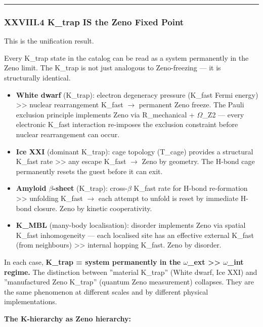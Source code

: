 \documentclass[12pt,a4paper]{article}
\begin{document}
\begin{center}
\rule{0.5\textwidth}{0.4pt}
\end{center}

\subsubsection{XXVIII.4 K\_trap IS the Zeno Fixed Point}

This is the unification result.

Every K\_trap state in the catalog can be read as a system permanently in the Zeno limit. The K\_trap is not just analogous to Zeno-freezing --- it is structurally identical.

\begin{itemize}
    \item \textbf{White dwarf} (K\_trap): electron degeneracy pressure (K\_fast Fermi energy) \textgreater{}\textgreater{} nuclear rearrangement K\_fast $\rightarrow$ permanent Zeno freeze. The Pauli exclusion principle implements Zeno via R\_mechanical + $\Omega$\_Z2 --- every electronic K\_fast interaction re-imposes the exclusion constraint before nuclear rearrangement can occur.
    \item \textbf{Ice XXI} (dominant K\_trap): cage topology (T\_cage) provides a structural K\_fast rate \textgreater{}\textgreater{} any escape K\_fast $\rightarrow$ Zeno by geometry. The H-bond cage permanently resets the guest before it can exit.
    \item \textbf{Amyloid $\beta$-sheet} (K\_trap): cross-$\beta$ K\_fast rate for H-bond re-formation \textgreater{}\textgreater{} unfolding K\_fast $\rightarrow$ each attempt to unfold is reset by immediate H-bond closure. Zeno by kinetic cooperativity.
    \item \textbf{K\_MBL} (many-body localisation): disorder implements Zeno via spatial K\_fast inhomogeneity --- each localised site has an effective external K\_fast (from neighbours) \textgreater{}\textgreater{} internal hopping K\_fast. Zeno by disorder.
\end{itemize}

In each case, \textbf{K\_trap = system permanently in the $\omega$\_ext \textgreater{}\textgreater{} $\omega$\_int regime.} The distinction between ''material K\_trap'' (White dwarf, Ice XXI) and ''manufactured Zeno K\_trap'' (quantum Zeno measurement) collapses. They are the same phenomenon at different scales and by different physical implementations.

\textbf{The K-hierarchy as Zeno hierarchy:}
\end{document}
